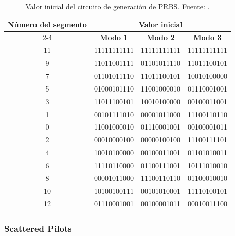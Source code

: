 {\begin{table}[H]
    \centering
    \renewcommand{\arraystretch}{1.2}
    \caption[Valor inicial del circuito de generación de PRBS.]{Valor inicial del circuito de generación de PRBS. Fuente: \cite{abnt}.}
    \label{tab:semillas_wi}
    \begin{tabular}{|c|c|c|c|}
        \hline
        \multirow{2}{*}{\textbf{Número del segmento}} & \multicolumn{3}{c|}{\textbf{Valor inicial}} \\
        \cline{2-4}
         & \textbf{Modo 1} & \textbf{Modo 2} & \textbf{Modo 3} \\
        \hline
        11 & 11111111111 & 11111111111 & 11111111111 \\
        \hline
        9  & 11011001111 & 01101011110 & 11011100101 \\
        \hline
        7  & 01101011110 & 11011100101 & 10010100000 \\
        \hline
        5  & 01000101110 & 11001000010 & 01110001001 \\
        \hline
        3  & 11011100101 & 10010100000 & 00100011001 \\
        \hline
        1  & 00101111010 & 00001011000 & 11100110110 \\
        \hline
        0  & 11001000010 & 01110001001 & 00100001011 \\
        \hline
        2  & 00010000100 & 00000100100 & 11100111101 \\
        \hline
        4  & 10010100000 & 00100011001 & 01101010011 \\
        \hline
        6  & 11110110000 & 01100111001 & 10111010010 \\
        \hline
        8  & 00001011000 & 11100110110 & 01100010010 \\
        \hline
        10 & 10100100111 & 00101010001 & 11110100101 \\
        \hline
        12 & 01110001001 & 00100001011 & 00010011100 \\
        \hline
    \end{tabular}
\end{table}}








\subsubsection{Scattered Pilots}

